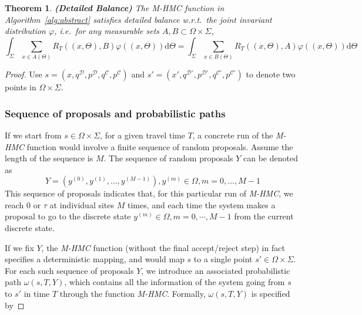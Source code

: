 \documentclass{article}
\newcommand{\cald}{\mathcal{D}}
\newcommand{\calc}{\mathcal{C}}
\newtheorem{theorem}{Theorem}
\begin{document}
\begin{theorem}\label{thm:detailed_balance}
	{\textbf{(Detailed Balance)}} The \textit{M-HMC} function in Algorithm~\ref{alg:abstract} satisfies detailed balance w.r.t.\ the joint invariant distribution $\varphi $, i.e.\ for any measurable sets $A, B \subset \Omega\times\Sigma$,
\begin{equation*}
 \int_{\Sigma} \sum_{x \in A (\Theta)} R_T ((x, \Theta), B) \varphi ((x, \Theta))  \mathrm{d} \Theta
 = \int_{\Sigma} \sum_{x \in B (\Theta)} R_T ((x, \Theta), A) \varphi ((x, \Theta))  \mathrm{d}\Theta
\end{equation*}

\end{theorem}

\begin{proof}
    Use $s=(x, q^\cald, p^\cald, q^\calc, p^\calc)$ and $s'=(x', q^{\cald\prime}, p^{\cald\prime}, q^{\calc\prime}, p^{\calc\prime})$ to denote two points in $\Omega\times\Sigma$. 
\subsubsection*{Sequence of proposals and probabilistic paths}
	If we start from $s\in\Omega\times\Sigma$, for a given travel time $T$, a concrete run of the \textit{M-HMC} function would involve a finite sequence of random proposals. Assume the length of the sequence is $M$. The sequence of random proposals $Y$ can be denoted as
  \[ Y = (y^{(0)}, y^{(1)}, \ldots, y^{(M - 1)}), y^{(m)} \in \Omega, m = 0, \ldots, M - 1 \]
  This sequence of proposals indicates that, for this particular run of \textit{M-HMC}, we reach 0 or $\tau$ at individual sites $M$ times, and each time the system makes a proposal to go to the discrete state $y^{(m)}\in\Omega, m=0, \cdots, M-1$ from the current discrete state. 

 If we fix $Y$, the \textit{M-HMC} function (without the final accept/reject step) in fact specifies a deterministic mapping, and would map $s$ to a single point $s'\in\Omega\times\Sigma$. For each such sequence of proposals $Y$, we introduce an associated probabilistic path $\omega(s, T, Y)$, which contains all the information of the system going from $s$ to $s'$ in time $T$ through the function \textit{M-HMC}. Formally, $\omega(s, T, Y)$ is specified by


\end{proof}
\end{document}
